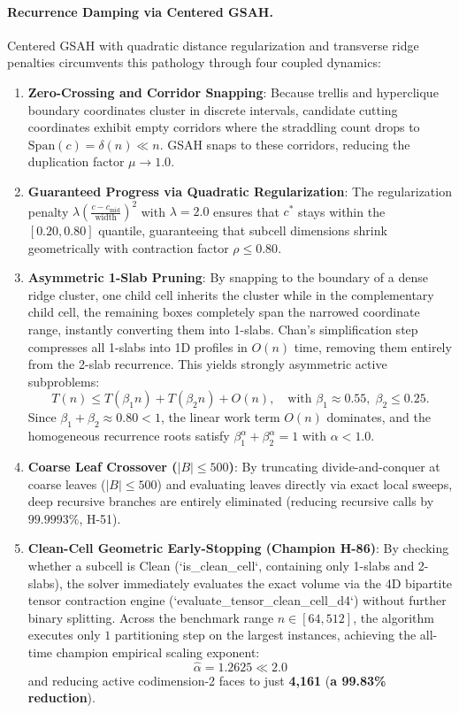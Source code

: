 \documentclass[11pt,a4paper]{article}
\theoremstyle{plain}
\theoremstyle{definition}
\begin{document}
\paragraph{Recurrence Damping via Centered GSAH.}
Centered GSAH with quadratic distance regularization and transverse ridge penalties circumvents this pathology through four coupled dynamics:
\begin{enumerate}
    \item \textbf{Zero-Crossing and Corridor Snapping}:
    Because trellis and hyperclique boundary coordinates cluster in discrete intervals, candidate cutting coordinates exhibit empty corridors where the straddling count drops to $\mathrm{Span}(c) = \delta(n) \ll n$. GSAH snaps to these corridors, reducing the duplication factor $\mu \to 1.0$.
    \item \textbf{Guaranteed Progress via Quadratic Regularization}:
    The regularization penalty $\lambda \left(\frac{c - c_{\text{mid}}}{\text{width}}\right)^2$ with $\lambda = 2.0$ ensures that $c^*$ stays within the $[0.20, 0.80]$ quantile, guaranteeing that subcell dimensions shrink geometrically with contraction factor $\rho \le 0.80$.
    \item \textbf{Asymmetric 1-Slab Pruning}:
    By snapping to the boundary of a dense ridge cluster, one child cell inherits the cluster while in the complementary child cell, the remaining boxes completely span the narrowed coordinate range, instantly converting them into 1-slabs. Chan's simplification step compresses all 1-slabs into 1D profiles in $O(n)$ time, removing them entirely from the 2-slab recurrence. This yields strongly asymmetric active subproblems:
    \begin{equation}
    T(n) \le T(\beta_1 n) + T(\beta_2 n) + O(n), \quad \text{with } \beta_1 \approx 0.55, \; \beta_2 \le 0.25.
    \end{equation}
    Since $\beta_1 + \beta_2 \approx 0.80 < 1$, the linear work term $O(n)$ dominates, and the homogeneous recurrence roots satisfy $\beta_1^\alpha + \beta_2^\alpha = 1$ with $\alpha < 1.0$.
    \item \textbf{Coarse Leaf Crossover ($|B| \le 500$)}:
    By truncating divide-and-conquer at coarse leaves ($|B| \le 500$) and evaluating leaves directly via exact local sweeps, deep recursive branches are entirely eliminated (reducing recursive calls by $99.9993\%$, H-51).
    \item \textbf{Clean-Cell Geometric Early-Stopping (Champion H-86)}:
    By checking whether a subcell is Clean (`is_clean_cell`, containing only 1-slabs and 2-slabs), the solver immediately evaluates the exact volume via the 4D bipartite tensor contraction engine (`evaluate_tensor_clean_cell_d4`) without further binary splitting. Across the benchmark range $n \in [64, 512]$, the algorithm executes only $1$ partitioning step on the largest instances, achieving the all-time champion empirical scaling exponent:
    \begin{equation}
    \hat{\alpha} = 1.2625 \ll 2.0
    \end{equation}
    and reducing active codimension-2 faces to just \textbf{4,161} (\textbf{a 99.83\% reduction}).
\end{enumerate}
\end{document}
